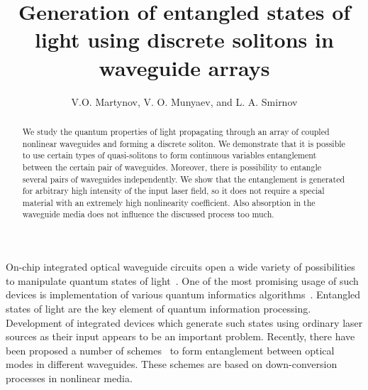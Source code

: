 \documentclass{osa-article}
\begin{document}
\title{Generation of entangled states of light using discrete solitons in waveguide arrays}

\author{V.O. Martynov, V. O. Munyaev, and L. A. Smirnov}

\address{Institute of Applied Physics of the Russian Academy of Sciences, Nizhny Novgorod, 603950, Russia\\
Department of Control Theory, Nizhny Novgorod State University, Nizhny Novgorod, 603950, Russia
}



\begin{abstract}
We study the quantum properties of light propagating through an array of coupled nonlinear waveguides and forming a discrete soliton. 
We demonstrate that it is possible to use certain types of quasi-solitons to form continuous variables entanglement between the certain pair of waveguides.
Moreover, there is possibility to entangle several pairs of waveguides independently.
We show that the entanglement is generated for arbitrary high intensity of the input laser field, so it does not require a special material with an extremely high nonlinearity coefficient. 
Also absorption in the waveguide media does not influence the discussed process too much. 
\end{abstract}
On-chip integrated optical waveguide circuits open a wide variety of possibilities to manipulate quantum states of light~\cite{zoubi_quantum_2017, silverstone_-chip_2014, matthews_manipulation_2009, kruse_dual-path_2015}. 
One of the most promising usage of such devices is implementation of various quantum informatics algorithms~\cite{nielsen_quantum_2000}. Entangled states of light are the key element of quantum information processing. 
Development of integrated devices which generate such states using ordinary laser sources as their input appears to be an important problem. 
Recently, there have been proposed a number of schemes~\cite{belsley_generating_2020, guo_parametric_2017, caspani_integrated_2017, solntsev_path-entangled_2017, yang_manipulation_2014} to form entanglement between optical modes in different waveguides. 
These schemes are based on down-conversion processes in nonlinear media. 
\end{document}
